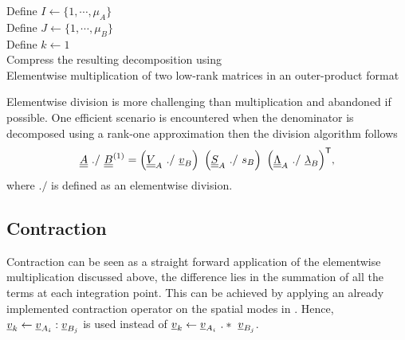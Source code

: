 \begin{algorithm}[hbt!]
	\vspace{0.2cm}
	\vspace{0.2cm}
	Define $I \leftarrow \{1,\cdots,\mu_A\}$\\
	Define $J \leftarrow \{1,\cdots,\mu_B\}$\\
	Define $k \leftarrow 1$\\
	Compress the resulting decomposition using \\

	\caption{Elementwise multiplication of two low-rank matrices in an outer-product format}
	\label{alg:element_wise_mult}
\end{algorithm}

Elementwise division is more challenging than multiplication and abandoned if possible. One efficient scenario is encountered when the denominator is decomposed using a rank-one approximation then the division algorithm follows
\begin{align}
	\mA {\ ./ \ } \mB^{(1)} = \left(\mV_A {\ ./ \ } \vv_B\right) \ \left(\mS_A {\ ./ \ } s_B\right) \ \T{\left(\mLambda_A {\ ./ \ } \vlambda_B\right)},
\end{align}
where $./$ is defined as an elementwise division.

\subsection{Contraction}
Contraction can be seen as a straight forward application of the elementwise multiplication discussed above, the difference lies in the summation of all the terms at each integration point. This can be achieved by applying an already implemented contraction operator on the spatial modes in . Hence, $\underline{v}_k \leftarrow \underline{v}_{A_i} : \underline{v}_{B_j}$ is used instead of $\vv_k \leftarrow \vv_{A_i} \ .* \ \vv_{B_j}$.

